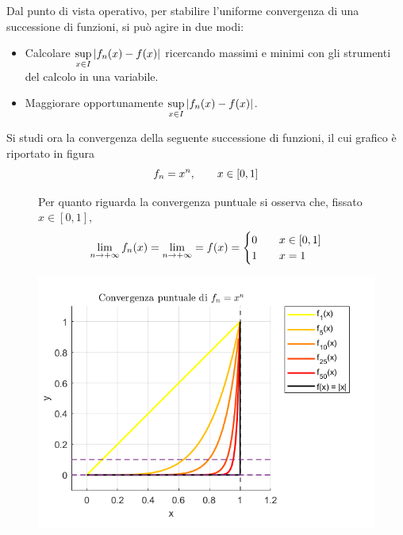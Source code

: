 \begin{oss}
 Dal punto di vista operativo, per stabilire l'uniforme convergenza di una successione di funzioni, si può agire in due modi:
    \begin{itemize}
       \item Calcolare $\sup\limits_{x \in I} |f_n(x)-f(x)|$ ricercando massimi e minimi con gli strumenti del calcolo in una variabile.
       \item Maggiorare opportunamente $\sup\limits_{x \in I} |f_n(x)-f(x)|$.
\end{itemize}
\end{oss}
\begin{example}
Si studi ora la convergenza della seguente successione di funzioni, il cui grafico è riportato in figura
\begin{equation*}
    f_n= x^n, \qquad x \in [0,1]
\end{equation*}
\begin{figure}[H]
    \centering
\begin{minipage}{0.6\textwidth}
Per quanto riguarda la convergenza puntuale si osserva che, fissato $x \in [0,1]$,
\begin{equation*}
    \lim_{n \to +\infty}{f_n(x)}= \lim_{n \to + \infty}= f(x) = \begin{cases}
        0 &\quad x \in [0,1]\\
        1 &\quad x=1
    \end{cases}
\end{equation*}
\end{minipage}
    \begin{minipage}{0.38\textwidth}
        \includegraphics[width=\textwidth]{Capitoli/Capitolo7/Convergenza puntuale.png}

\end{minipage}
\end{figure}
\end{example}
